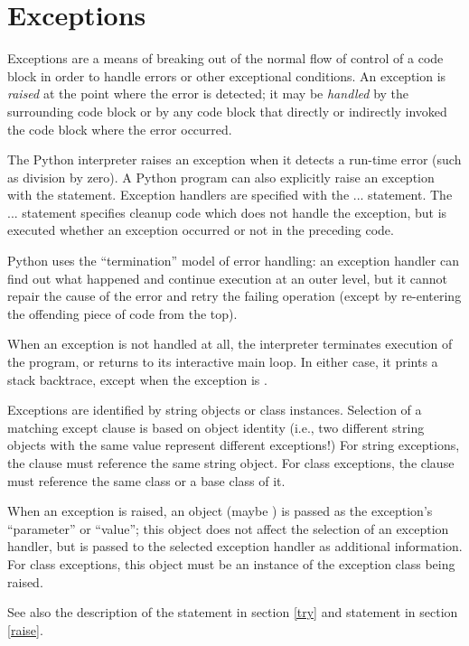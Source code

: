 \section{Exceptions \label{exceptions}}

Exceptions are a means of breaking out of the normal flow of control
of a code block in order to handle errors or other exceptional
conditions.  An exception is
\emph{raised} at the point where the error
is detected; it may be \emph{handled} by
the surrounding code block or by any code block that directly or
indirectly invoked the code block where the error occurred.

The Python interpreter raises an exception when it detects a run-time
error (such as division by zero).  A Python program can also
explicitly raise an exception with the  statement.
Exception handlers are specified with the  ... 
statement.  The  ...  statement
specifies cleanup code which does not handle the exception, but is
executed whether an exception occurred or not in the preceding code.

Python uses the ``termination'' model of
error handling: an exception handler can find out what happened and
continue execution at an outer level, but it cannot repair the cause
of the error and retry the failing operation (except by re-entering
the offending piece of code from the top).

When an exception is not handled at all, the interpreter terminates
execution of the program, or returns to its interactive main loop.  In
either case, it prints a stack backtrace, except when the exception is 
.

Exceptions are identified by string objects or class instances.
Selection of a matching except clause is based on object identity
(i.e., two different string objects with the same value represent
different exceptions!)  For string exceptions, the 
clause must reference the same string object.  For class exceptions,
the  clause must reference the same class or a base
class of it.

When an exception is raised, an object (maybe ) is passed
as the exception's ``parameter'' or ``value''; this object does not
affect the selection of an exception handler, but is passed to the
selected exception handler as additional information.  For class
exceptions, this object must be an instance of the exception class
being raised.

See also the description of the  statement in section
\ref{try} and  statement in section \ref{raise}.

